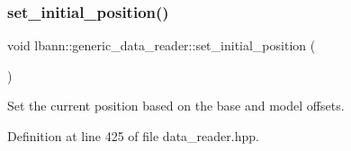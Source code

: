 \subsubsection{\texorpdfstring{set\+\_\+initial\+\_\+position()}{set\_initial\_position()}}
{\footnotesize\ttfamily void lbann\+::generic\+\_\+data\+\_\+reader\+::set\+\_\+initial\+\_\+position (\begin{DoxyParamCaption}{ }\end{DoxyParamCaption})\hspace{0.3cm}{\ttfamily [inline]}}



Set the current position based on the base and model offsets. 



Definition at line 425 of file data\+\_\+reader.\+hpp.


